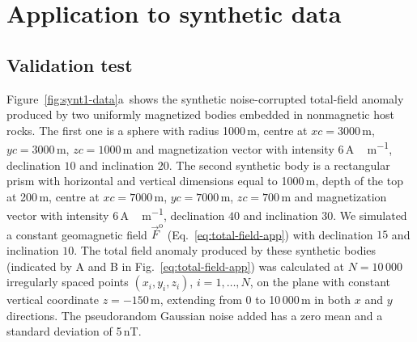 \documentclass[journal abbreviation, npg]{copernicus}
\providecommand{\DIFaddend}{} %
\begin{document}
\DIFaddend \section{Application to synthetic data}

\subsection{Validation test}

Figure~\ref{fig:synt1-data}a~shows the synthetic noise-corrupted total-field
anomaly produced by two uniformly magnetized bodies embedded in nonmagnetic
host rocks. The first one is a sphere with radius 1000\,\unit{m}, centre at
$xc = 3000$\,\unit{m}, $yc = 3000$\,\unit{m}, $zc = 1000$\,\unit{m} and
magnetization vector with intensity $6$\,\unit{A\,m^{-1}}, declination
$10${\degree} and inclination $20${\degree}. The second synthetic body is
a rectangular prism with horizontal and vertical dimensions equal to
1000\,\unit{m}, depth of the top at 200\,\unit{m}, centre at $xc =
7000$\,\unit{m}, $yc = 7000$\,\unit{m}, $zc = 700$\,\unit{m} and
magnetization vector with intensity $6$\,\unit{A\,m^{-1}}, declination
$40${\degree} and inclination $30${\degree}. We simulated a constant
geomagnetic field $\vec{F}^\mathrm{o}$ (Eq.~\ref{eq:total-field-app}) with
declination $15${\degree} and inclination $10${\degree}. The total field
anomaly produced by these synthetic bodies (indicated by A and B in
Fig.~\ref{eq:total-field-app}) was calculated at $N = 10\,000$ irregularly
spaced points $(x_{i}, y_{i}, z_{i})$, $i = 1, \ldots, N$, on the plane with
constant vertical coordinate $z=-150$\,\unit{m}, extending from 0 to
10\,000\,\unit{m} in both $x$ and $y$ directions. The pseudorandom Gaussian
noise added has a zero mean and a standard deviation of 5\,nT.
\end{document}
